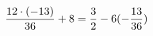 \documentclass[preview]{standalone}
\begin{document}
\begin{align*}
\special{dvisvgm:raw <g id='unique000'>}\frac{12 \cdot (-13)}{36} + 8 = \frac{3}{2} - 6(- \frac{13}{36})\special{dvisvgm:raw </g>}
\end{align*}
\end{document}
